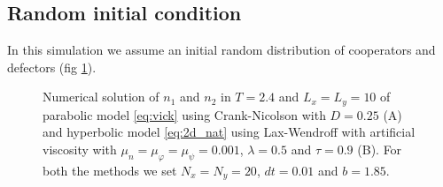 \subsection{Random initial condition}

In this simulation we assume an initial random distribution of cooperators
and defectors (fig \ref{fig:rand}). 

\begin{figure}
\caption{\label{fig:rand}Numerical solution of $n_{1}$ and $n_{2}$ in $T=2.4$
and $L_{x}=L_{y}=10$ of parabolic model \ref{eq:vick} using Crank-Nicolson
with $D=0.25$ (A) and hyperbolic model \ref{eq:2d_nat} using Lax-Wendroff
with artificial viscosity with $\mu_{n}=\mu_{\varphi}=\mu_{\psi}=0.001$,
$\lambda=0.5$ and $\tau=0.9$ (B). For both the methods we set $N_{x}=N_{y}=20$,
$dt=0.01$ and $b=1.85$.}
\end{figure}


